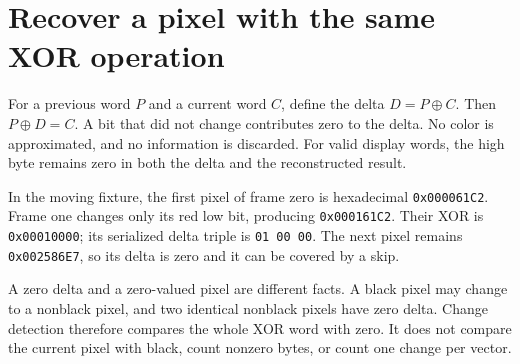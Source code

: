 \section{Recover a pixel with the same XOR operation}
For a previous word $P$ and a current word $C$, define the delta $D=P\mathbin{\oplus}C$.
Then $P\mathbin{\oplus}D=C$. A bit that did not change contributes zero to the delta.
No color is approximated, and no information is discarded. For valid display words,
the high byte remains zero in both the delta and the reconstructed result.

In the moving fixture, the first pixel of frame zero is hexadecimal
\texttt{0x000061C2}. Frame one changes only its red low bit, producing
\texttt{0x000161C2}. Their XOR is \texttt{0x00010000}; its serialized delta triple
is \texttt{01 00 00}. The next pixel remains \texttt{0x002586E7}, so its delta is
zero and it can be covered by a skip.

A zero delta and a zero-valued pixel are different facts. A black pixel may change
to a nonblack pixel, and two identical nonblack pixels have zero delta. Change
detection therefore compares the whole XOR word with zero. It does not compare the
current pixel with black, count nonzero bytes, or count one change per vector.
